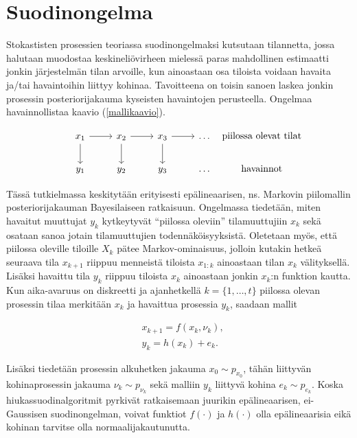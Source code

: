 \documentclass[
  12pt,
  a4paper, twoside]{book}
\begin{document}
\section{Suodinongelma}

Stokastisten prosessien teoriassa suodinongelmaksi kutsutaan tilannetta, jossa halutaan muodostaa keskineliövirheen mielessä paras mahdollinen estimaatti jonkin järjestelmän tilan arvoille, kun ainoastaan osa tiloista voidaan havaita ja/tai havaintoihin liittyy kohinaa. Tavoitteena on toisin sanoen laskea jonkin prosessin posteriorijakauma kyseisten havaintojen perusteella. Ongelmaa havainnollistaa kaavio (\ref{mallikaavio}).

\begin{equation}\label{mallikaavio}
\begin{tikzcd}
x_1 \arrow[d] \arrow[r] & x_2 \arrow[d] \arrow[r] & x_3 \arrow[d] \arrow[r] & \ldots & \makebox[\widthof{$ \text{havainnot}$}]{$\text{piilossa olevat tilat}$} \\
y_1  & y_2  & y_3  & \ldots & \makebox[\widthof{$ \text{havainnot}$}]{$\text{havainnot}$}
\end{tikzcd}
\end{equation}

Tässä tutkielmassa keskitytään erityisesti epälineaarisen, ns. Markovin piilomallin posteriorijakauman Bayesilaiseen ratkaisuun. Ongelmassa tiedetään, miten havaitut muuttujat \(y_k\) kytkeytyvät ``piilossa oleviin'' tilamuuttujiin \(x_k\) sekä osataan sanoa jotain tilamuuttujien todennäköisyyksistä. Oletetaan myös, että piilossa oleville tiloille \(X_k\) pätee Markov-ominaisuus, jolloin kutakin hetkeä seuraava tila \(x_{k+1}\) riippuu menneistä tiloista \(x_{1:k}\) ainoastaan tilan \(x_k\) välityksellä. Lisäksi havaittu tila \(y_k\) riippuu tiloista \(x_{k}\) ainoastaan jonkin \(x_k\):n funktion kautta. Kun aika-avaruus on diskreetti ja ajanhetkellä \(k=\{1,\ldots,t\}\) piilossa olevan prosessin tilaa merkitään \(x_k\) ja havaittua prosessia \(y_k\), saadaan mallit

\begin{align}
&\label{malli-1} x_{k+1} = f(x_k, \nu_k),\\
&\label{malli-2} y_{k} = h(x_k)+e_k.
\end{align}

Lisäksi tiedetään prosessin alkuhetken jakauma \(x_0 \sim p_{x_{0}}\), tähän liittyvän kohinaprosessin jakauma \(\nu_k \sim p_{\nu_{k}}\) sekä malliin \(y_k\) liittyvä kohina \(e_k \sim p_{e_k}\). Koska hiukassuodinalgoritmit pyrkivät ratkaisemaan juurikin epälineaarisen, ei-Gaussisen suodinongelman, voivat funktiot \(f(\cdot)\) ja \(h(\cdot)\) olla epälineaarisia eikä kohinan tarvitse olla normaalijakautunutta.
\end{document}
